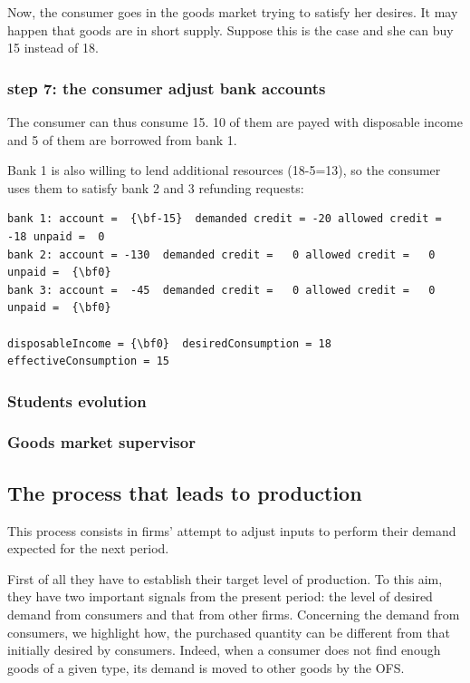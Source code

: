 \documentclass{article}
\begin{document}
Now, the consumer goes in the goods market trying to satisfy her desires. It may happen that goods are in short supply. Suppose this is the case and she can buy 15 instead of 18. 

\subsubsection*{step 7: the consumer adjust bank accounts}

The consumer can thus consume 15. 10 of them are payed with disposable income and 5 of them are borrowed from bank 1. 

Bank 1 is also willing to lend additional resources (18-5=13), so the consumer uses them to satisfy bank 2 and 3 refunding requests:

\begin{Verbatim}[commandchars=\\\{\}]
bank 1: account =  {\bf-15}  demanded credit = -20 allowed credit = -18 unpaid =  0
bank 2: account = -130  demanded credit =   0 allowed credit =   0 unpaid =  {\bf0}
bank 3: account =  -45  demanded credit =   0 allowed credit =   0 unpaid =  {\bf0}

disposableIncome = {\bf0}  desiredConsumption = 18 effectiveConsumption = 15
\end{Verbatim}

\newpage
\subsubsection{Students evolution}

\newpage
\subsubsection{Goods market supervisor}

\newpage
\subsection{The process that leads to production}

This process consists in firms' attempt to adjust inputs to perform their demand expected for the next period.

First of all they have to establish their target level of production. To this aim, they have two important signals from the present period: the level of desired demand from consumers and that from other firms.
Concerning the demand from consumers, we highlight how, the purchased quantity can be different from that initially desired by consumers. Indeed, when a consumer does not find enough goods of a given type, its demand is moved to other goods by the OFS.
\end{document}
